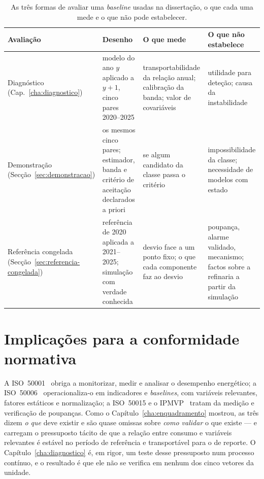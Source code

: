\begin{table}[htbp]
  \centering
  \caption[Os três estimandos deste capítulo]{As três formas de avaliar uma
  \emph{baseline} usadas na dissertação, o que cada uma mede e o que não
  pode estabelecer.}
  \label{tab:estimandos}
  \small
  \begin{tabular}{p{3.0cm}p{3.6cm}p{3.6cm}p{3.4cm}}
    \toprule
    Avaliação & Desenho & O que mede & O que não estabelece \\
    \midrule
    Diagnóstico (Cap.~\ref{cha:diagnostico}) & modelo do ano $y$ aplicado a $y{+}1$, cinco pares 2020--2025 & transportabilidade da relação anual; calibração da banda; valor de covariáveis & utilidade para deteção; causa da instabilidade \\
    Demonstração (Secção~\ref{sec:demonstracao}) & os mesmos cinco pares; estimador, banda e critério de aceitação declarados a priori & se algum candidato da classe passa o critério & impossibilidade da classe; necessidade de modelos com estado \\
    Referência congelada (Secção~\ref{sec:referencia-congelada}) & referência de 2020 aplicada a 2021--2025; simulação com verdade conhecida & desvio face a um ponto fixo; o que cada componente faz ao desvio & poupança, alarme validado, mecanismo; factos sobre a refinaria a partir da simulação \\
    \bottomrule
  \end{tabular}
\end{table}

\section{Implicações para a conformidade normativa}
\label{sec:implicacoes-normativas}

A ISO~50001~\cite{ISO50001_2018} obriga a monitorizar, medir e analisar o
desempenho energético; a ISO~50006~\cite{ISO50006_2014} operacionaliza-o em
indicadores e \emph{baselines}, com variáveis relevantes, fatores estáticos
e normalização; a ISO~50015 e o IPMVP~\cite{ISO50015_2014,IPMVP_2022} tratam
da medição e verificação de poupanças. Como o Capítulo~\ref{cha:enquadramento}
mostrou, as três dizem \emph{o que} deve existir e são quase omissas sobre
\emph{como validar} o que existe --- e carregam o pressuposto tácito de que a
relação entre consumo e variáveis relevantes é estável no período de
referência e transportável para o de reporte. O Capítulo~\ref{cha:diagnostico}
é, em rigor, um teste desse pressuposto num processo contínuo, e o resultado
é que ele não se verifica em nenhum dos cinco vetores da unidade.


